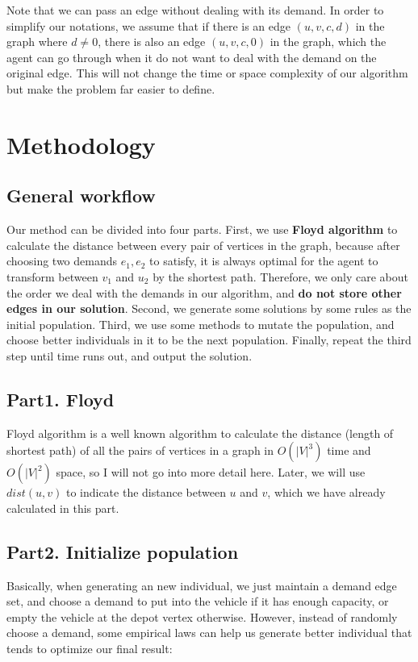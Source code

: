 \documentclass[lettersize,journal]{IEEEtran}
\begin{document}
Note that we can pass an edge without dealing with its demand. In order to simplify our notations, we assume that if there is an edge $(u,v,c,d)$ in the graph where $d\not=0$, there is also an edge $(u,v,c,0)$ in the graph, which the agent can go through when it do not want to deal with the demand on the original edge. This will not change the time or space complexity of our algorithm but make the problem far easier to define.

\section{Methodology}

\subsection{General workflow}

Our method can be divided into four parts. First, we use \textbf{Floyd algorithm} to calculate the distance between every pair of vertices in the graph, because after choosing two demands $e_1,e_2$ to satisfy, it is always optimal for the agent to transform between $v_1$ and $u_2$ by the shortest path. Therefore, we only care about the order we deal with the demands in our algorithm, and \textbf{do not store other edges in our solution}. Second, we generate some solutions by some rules as the initial population. Third, we use some methods to mutate the population, and choose better individuals in it to be the next population. Finally, repeat the third step until time runs out, and output the solution.

\subsection{Part1. Floyd}

Floyd algorithm is a well known algorithm to calculate the distance (length of shortest path) of all the pairs of vertices in a graph in $O(|V|^3)$ time and $O(|V|^2)$ space, so I will not go into more detail here. Later, we will use $dist(u,v)$ to indicate the distance between $u$ and $v$, which we have already calculated in this part.

\subsection{Part2. Initialize population}

Basically, when generating an new individual, we just maintain a demand edge set, and choose a demand to put into the vehicle if it has enough capacity, or empty the vehicle at the depot vertex otherwise. However, instead of randomly choose a demand, some empirical laws can help us generate better individual that tends to optimize our final result:
\end{document}
